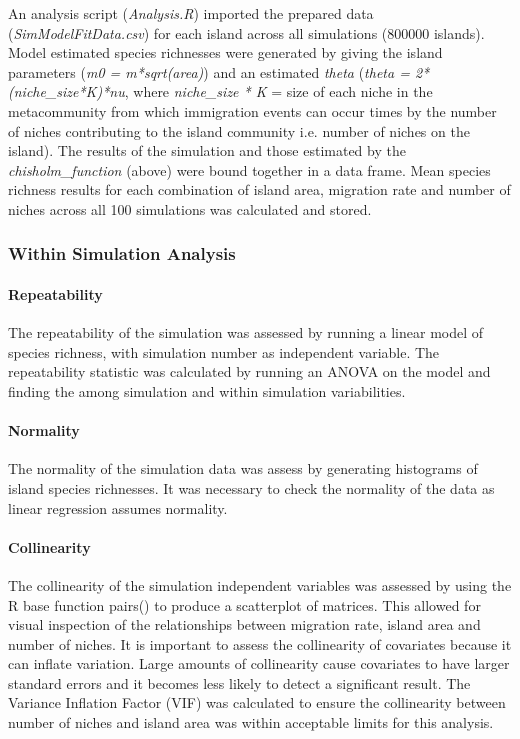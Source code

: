 \documentclass{article}
\begin{document}
\noindent An analysis script (\textit{Analysis.R}) imported the prepared data (\textit{SimModelFitData.csv}) for each island across all simulations (800000 islands). Model estimated species richnesses were generated by giving the island parameters (\textit{m0 = m*sqrt(area)}) and an estimated \textit{theta} (\textit{theta = 2*(niche\_size*K)*nu}, where \textit{niche\_size * K} = size of each niche in the metacommunity from which immigration events can occur times by the number of niches contributing to the island community i.e. number of niches on the island). The results of the simulation and those estimated by the \textit{chisholm\_function} (above) were bound together in a data frame. Mean species richness results for each combination of island area, migration rate and number of niches across all 100 simulations was calculated and stored.
  
\subsubsection{Within Simulation Analysis}

\paragraph {Repeatability} 
The repeatability of the simulation was assessed by running a linear model of species richness, with simulation number as independent variable. The repeatability statistic was calculated by running an ANOVA on the model and finding the among simulation and within simulation variabilities.

\paragraph{Normality}
The normality of the simulation data was assess by generating histograms of island species richnesses. It was necessary to check the normality of the data as linear regression assumes normality.

\paragraph{Collinearity}
The collinearity of the simulation independent variables was assessed by using the R base function pairs() to produce a scatterplot of matrices. This allowed for visual inspection of the relationships between migration rate, island area and number of niches. It is important to assess the collinearity of covariates because it can inflate variation. Large amounts of collinearity cause covariates to have larger standard errors and it becomes less likely to detect a significant result. The Variance Inflation Factor (VIF) was calculated to ensure the collinearity between number of niches and island area was within acceptable limits for this analysis. 
\end{document}
